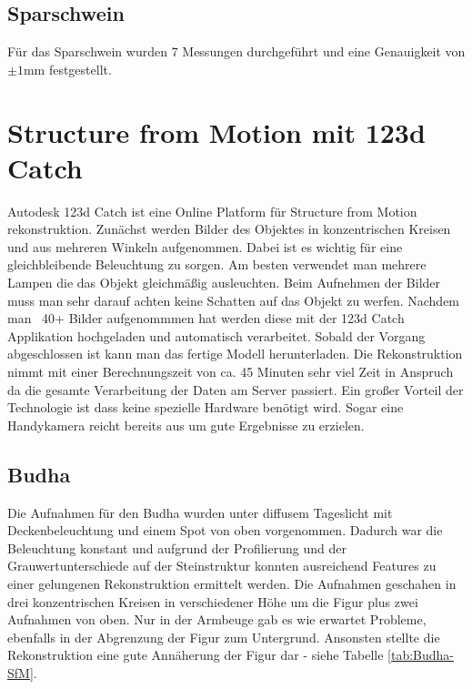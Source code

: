 \documentclass[]{article}
\begin{document}
\subsection{Sparschwein}
Für das Sparschwein wurden 7 Messungen durchgeführt und eine Genauigkeit von $\pm 1$mm festgestellt.

\section{Structure from Motion mit 123d Catch} %

Autodesk 123d Catch ist eine Online Platform für Structure from Motion rekonstruktion. Zunächst werden Bilder des Objektes in konzentrischen Kreisen und aus mehreren Winkeln aufgenommen. Dabei ist es wichtig für eine gleichbleibende Beleuchtung zu sorgen. Am besten verwendet man mehrere Lampen die das Objekt gleichmäßig ausleuchten. Beim Aufnehmen der Bilder muss man sehr darauf achten keine Schatten auf das Objekt zu werfen. Nachdem man ~40+ Bilder aufgenommmen hat werden diese mit der 123d Catch Applikation hochgeladen und automatisch verarbeitet. Sobald der Vorgang abgeschlossen ist kann man das fertige Modell herunterladen. Die Rekonstruktion nimmt mit einer Berechnungszeit von ca. 45 Minuten sehr viel Zeit in Anspruch da die gesamte Verarbeitung der Daten am Server passiert. Ein großer Vorteil der Technologie ist dass keine spezielle Hardware benötigt wird. Sogar eine Handykamera reicht bereits aus um gute Ergebnisse zu erzielen.

\subsection{Budha}

Die Aufnahmen für den Budha wurden unter diffusem Tageslicht mit Deckenbeleuchtung und einem Spot von oben vorgenommen. Dadurch war die Beleuchtung konstant und aufgrund der Profilierung und der Grauwertunterschiede auf der Steinstruktur konnten ausreichend Features zu einer gelungenen Rekonstruktion ermittelt werden. Die Aufnahmen geschahen in drei konzentrischen Kreisen in verschiedener Höhe um die Figur plus zwei Aufnahmen von oben.
Nur in der Armbeuge gab es wie erwartet Probleme, ebenfalls in der Abgrenzung der Figur zum Untergrund. Ansonsten stellte die Rekonstruktion eine gute Annäherung der Figur dar - siehe Tabelle \ref{tab:Budha-SfM}.
\end{document}
